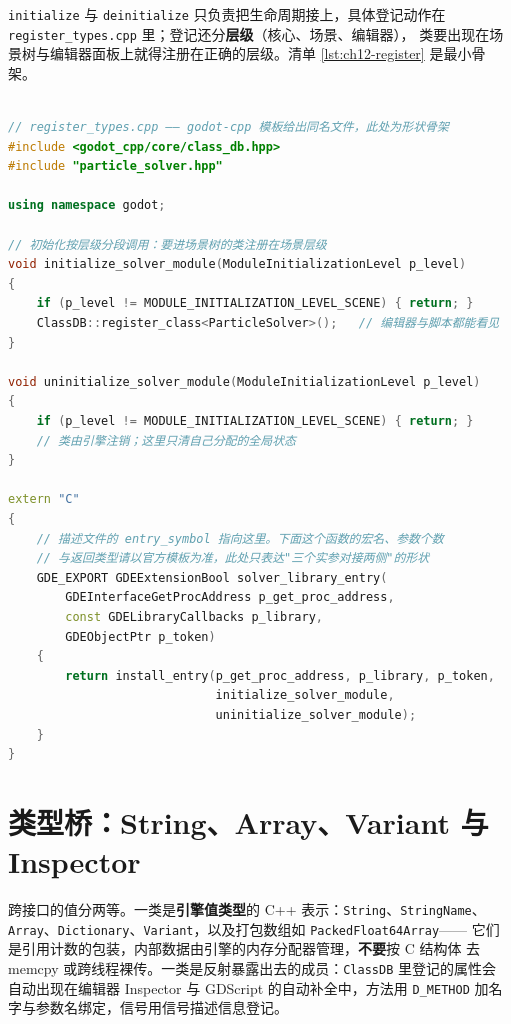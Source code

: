 \documentclass[12pt,a4paper,fontset=fandol]{ctexbook}
\newcommand{\Tp}[1]{\texttt{#1}}
\newcommand{\Bk}{\discretionary{}{}{}}
\newcommand{\Lang}[1]{\textsf{#1}}
\newcommand{\CL}{\Lang{C}}
\begin{document}
\Tp{initialize} 与 \Tp{deinitialize} 只负责把生命周期接上，具体登记动作在
\Tp{register\_{\Bk}types.cpp} 里；登记还分\textbf{层级}（核心、场景、编辑器），
类要出现在场景树与编辑器面板上就得注册在正确的层级。清单 \ref{lst:ch12-register}
是最小骨架。

\begin{lstlisting}[language=C++, style=cppstyle, caption={register types 的注册骨架：入口对接与 ClassDB 登记}, label={lst:ch12-register}, framexleftmargin=12pt, framexrightmargin=12pt]

// register_types.cpp —— godot-cpp 模板给出同名文件，此处为形状骨架
#include <godot_cpp/core/class_db.hpp>
#include "particle_solver.hpp"

using namespace godot;

// 初始化按层级分段调用：要进场景树的类注册在场景层级
void initialize_solver_module(ModuleInitializationLevel p_level)
{
    if (p_level != MODULE_INITIALIZATION_LEVEL_SCENE) { return; }
    ClassDB::register_class<ParticleSolver>();   // 编辑器与脚本都能看见
}

void uninitialize_solver_module(ModuleInitializationLevel p_level)
{
    if (p_level != MODULE_INITIALIZATION_LEVEL_SCENE) { return; }
    // 类由引擎注销；这里只清自己分配的全局状态
}

extern "C"
{
    // 描述文件的 entry_symbol 指向这里。下面这个函数的宏名、参数个数
    // 与返回类型请以官方模板为准，此处只表达"三个实参对接两侧"的形状
    GDE_EXPORT GDEExtensionBool solver_library_entry(
        GDEInterfaceGetProcAddress p_get_proc_address,
        const GDELibraryCallbacks p_library,
        GDEObjectPtr p_token)
    {
        return install_entry(p_get_proc_address, p_library, p_token,
                             initialize_solver_module,
                             uninitialize_solver_module);
    }
}
\end{lstlisting}

\section{类型桥：String、Array、Variant 与 Inspector}
\label{sec:ch12-type-bridge}

跨接口的值分两等。一类是\textbf{引擎值类型}的 C++ 表示：\Tp{String}、\Tp{StringName}、
\Tp{Array}、\Tp{Dictionary}、\Tp{Variant}，以及打包数组如 \Tp{PackedFloat64Array}——
它们是引用计数的包装，内部数据由引擎的内存分配器管理，\textbf{不要}按 \CL{} 结构体
去 memcpy 或跨线程裸传。一类是反射暴露出去的成员：\Tp{ClassDB} 里登记的属性会
自动出现在编辑器 Inspector 与 \Lang{GDScript} 的自动补全中，方法用
\Tp{D\_METHOD} 加名字与参数名绑定，信号用信号描述信息登记。
\end{document}
